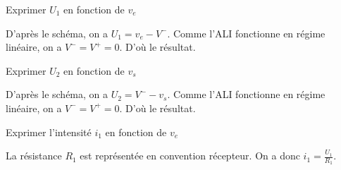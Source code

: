 


\begin{enonce}
  Exprimer \(U_{1}\) en fonction de \(v_{e}\)
\end{enonce}


\begin{corrige}
  D’après le schéma, on a \(U_{1} = v_{e} - V^{-}\). 
    Comme l’ALI fonctionne en régime linéaire, on a \(V^{-} = V^{+} = 0\). D’où le résultat.
\end{corrige}




\begin{enonce}
  Exprimer \(U_{2}\) en fonction de \(v_{s}\)
\end{enonce}


\begin{corrige}
  D’après le schéma, on a \(U_{2} = V^{-} - v_{s}\).
  Comme l’ALI fonctionne en régime linéaire, on a \(V^{-} = V^{+} = 0\). D’où le résultat.
\end{corrige}




\begin{enonce}
  Exprimer l'intensité \(i_{1}\)  en fonction de \(v_{e}\)
\end{enonce}


\begin{corrige}
  La résistance \(R_{1}\) est représentée en convention récepteur. On a donc \(i_{1} = \frac{U_{1}}{R_{1}}\).
\end{corrige}




